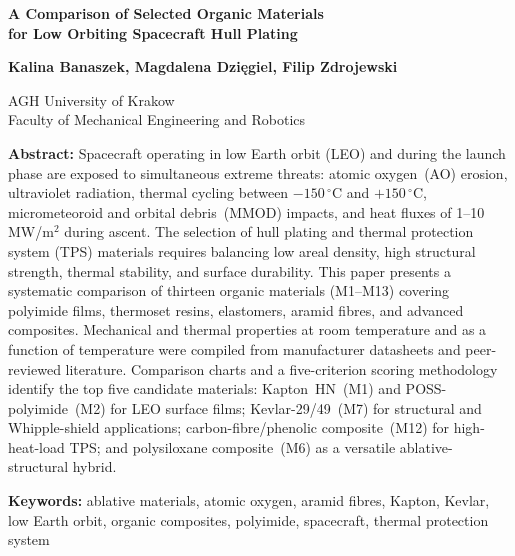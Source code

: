 \documentclass[11pt,a4paper]{article}
\begin{document}
\pagestyle{plain}

\begin{center}
  {\cambriafont\fontsize{14}{16.8}\selectfont\bfseries
    A Comparison of Selected Organic Materials\\[4pt]
    for Low Orbiting Spacecraft Hull Plating\par}

  \vspace{12pt}

  {\cambriafont\fontsize{10}{12}\selectfont\bfseries
    Kalina Banaszek, Magdalena Dzięgiel, Filip Zdrojewski\par}

  \vspace{5pt}

  {\fontsize{9}{10.8}\selectfont
    AGH University of Krakow\\
    Faculty of Mechanical Engineering and Robotics\par}
\end{center}

\vspace{8pt}

\begingroup
  \setlength{\leftskip}{0.75cm}
  \setlength{\rightskip}{0.75cm}
  \fontsize{9}{10.8}\selectfont\noindent
  \textbf{Abstract:}
  Spacecraft operating in low Earth orbit (LEO) and during the launch phase are
  exposed to simultaneous extreme threats: atomic oxygen~(AO) erosion, ultraviolet
  radiation, thermal cycling between $-150\,^{\circ}$C and $+150\,^{\circ}$C,
  micrometeoroid and orbital debris~(MMOD) impacts, and heat fluxes of
  1--10\,MW/m$^{2}$ during ascent. The selection of hull plating and thermal
  protection system (TPS) materials requires balancing low areal density, high
  structural strength, thermal stability, and surface durability.
  This paper presents a systematic comparison of thirteen organic materials
  (M1--M13) covering polyimide films, thermoset resins, elastomers, aramid
  fibres, and advanced composites. Mechanical and thermal properties at room
  temperature and as a function of temperature were compiled from manufacturer
  datasheets and peer-reviewed literature. Comparison charts and a five-criterion
  scoring methodology identify the top five candidate materials: Kapton~HN~(M1)
  and POSS-polyimide~(M2) for LEO surface films; Kevlar-29/49~(M7) for
  structural and Whipple-shield applications; carbon-fibre/phenolic
  composite~(M12) for high-heat-load TPS; and polysiloxane composite~(M6) as
  a versatile ablative-structural hybrid.
  \par\vspace{4pt}
  \noindent\textbf{Keywords:}
  ablative materials, atomic oxygen, aramid fibres, Kapton, Kevlar,
  low Earth orbit, organic composites, polyimide,
  spacecraft, thermal protection system
\endgroup
\end{document}
